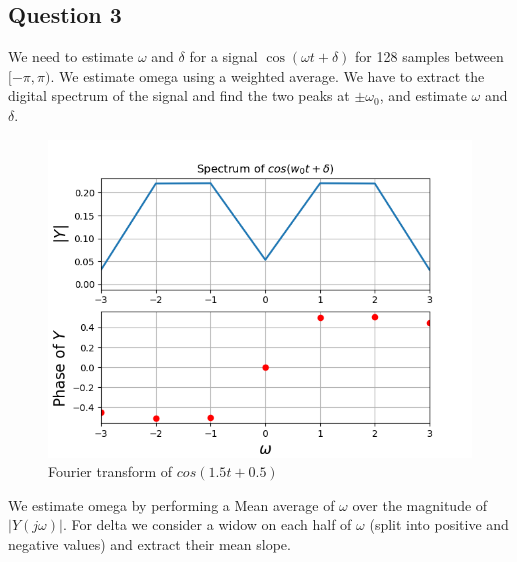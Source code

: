 \documentclass[11pt, a4paper]{article}
\begin{document}
\subsection{Question 3}
We need to estimate $\omega$ and $\delta$ for a signal $\cos(\omega t + \delta)$ for 128 samples between $[-\pi,\pi)$. We estimate omega using a weighted average. We have to extract the digital spectrum of the signal and find the two peaks at $\pm\omega_0$, and estimate $\omega$ and $\delta$.
\begin{figure}[h!]
\centering
\includegraphics[scale=0.6]{fig9.png}
\caption{Fourier transform of $cos(1.5t+0.5)$}
\label{fig:universe}
\end{figure}

We estimate omega by performing a Mean average of $\omega$ over the magnitude of $|Y(j\omega)|$.
For delta we consider a widow on each half of $\omega$ (split into positive and negative values) and extract their mean slope. 
\end{document}
